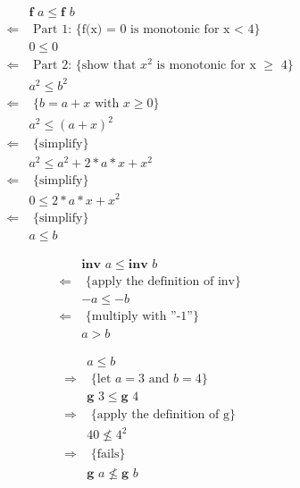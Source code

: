 \documentclass[11pt,a4paper]{scrartcl}
\begin{document}
\begin{align*}
&\textbf{f }a \leq \textbf{f }b\\
\Leftarrow &\text{ Part 1: \{f(x) = 0 is monotonic for x < 4\}}\\
&0 \leq 0\\
\Leftarrow &\text{ Part 2: \{show that $x^2$ is monotonic for x $\geq$ 4\}}\\
&a^2 \leq b^2\\
\Leftarrow &\text{ \{$b = a+x$ with $x \geq 0$\}}\\
&a^2 \leq (a+x)^2\\
\Leftarrow &\text{ \{simplify\}}\\
&a^2 \leq a^2+2*a*x+x^2\\
\Leftarrow &\text{ \{simplify\}}\\
&0 \leq 2*a*x+x^2\\
\Leftarrow &\text{ \{simplify\}}\\
&a \leq b
\end{align*}


\begin{align*}
&\textbf{inv }a \leq \textbf{inv }b\\
\Leftarrow &\text{ \{apply the definition of inv\}}\\
&-a \leq -b\\
\Leftarrow &\text{ \{multiply with ''-1''\}}\\
&a > b
\end{align*}

\begin{align*}
&a \leq b\\
\Rightarrow &\text{ \{let $a=3$ and $b=4$\}}\\
&\textbf{g }3 \leq \textbf{g }4\\
\Rightarrow &\text{ \{apply the definition of g\}}\\
&40 \nleq 4^2\\
\Rightarrow &\text{ \{fails\}}\\
&\textbf{g }a \nleq \textbf{g }b
\end{align*}
\end{document}
